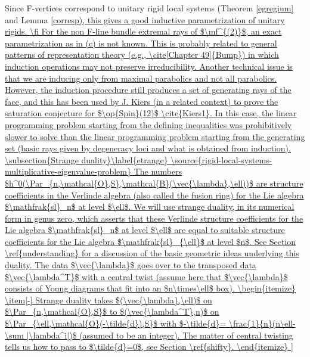 Since F-vertices correspond to unitary rigid local systems (Theorem \ref{egregium} and Lemma \ref{corresp), this gives a good inductive parametrization of unitary rigids.
\fi

For the non F-line bundle extremal rays of  $\mf^{(2)}$, an exact parametrization as in (c) is not known. This is probably related to general patterns of representation theory (e.g., \cite[Chapter 49]{Bump}) in which induction operations  may not preserve irreducibility. Another technical issue is that we are inducing only from maximal parabolics and not all parabolics. However, the induction procedure still produces a set of generating rays of the face, and this has been used by J. Kiers (in a related context) to prove  the saturation conjecture for $\op{Spin}(12)$  \cite{Kiers1}. In this case, the linear programming problem starting from the defining inequalities was prohibitively slower to solve than the linear programming problem starting from the generating set (basic rays given by degeneracy loci and what is obtained from
induction).



\subsection{Strange duality}\label{etrange}
\source{rigid-local-systems-multiplicative-eigenvalue-problem}
The numbers $h^0(\Par_{n,\mathcal{O},S},\mathcal{B}(\vec{\lambda},\ell))$ are structure coefficients in the Verlinde algebra (also called the fusion ring)
for the Lie algebra $\mathfrak{sl}_n$ at level $\ell$.  We will use strange duality, in its numerical form in genus zero,  which asserts that these Verlinde structure coefficients for the Lie algebra $\mathfrak{sl}_n$ at level $\ell$ are equal to suitable structure coefficients for the Lie algebra $\mathfrak{sl}_{\ell}$ at level $n$. See Section \ref{understanding} for a discussion of the basic  geometric ideas underlying this duality.

The data $\vec{\lambda}$ goes over to the transposed data $\vec{\lambda^T}$ with a central  twist (assume here that $\vec{\lambda}$ consists of Young diagrams that fit into an $n\times\ell$ box).
\begin{itemize}
\item[-] Strange duality takes $(\vec{\lambda},\ell)$ on $\Par_{n,\mathcal{O},S}$ to $(\vec{\lambda^T},n)$ on $\Par_{\ell,\mathcal{O}(-\tilde{d}),S}$ with $-\tilde{d}= \frac{1}{n}(n\ell-\sum |\lambda^i|)$ (assumed to be an integer). The matter of central twisting tells us how to pass to $\tilde{d}=0$, see Section \ref{shifty}.
\end{itemize}

}
